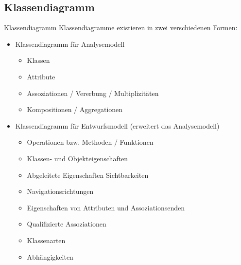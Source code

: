 \subsection{Klassendiagramm}

\begin{defi}{Klassendiagramm}
    Klassendiagramme existieren in zwei verschiedenen Formen:

    \begin{itemize}
        \item Klassendiagramm für Analysemodell
              \begin{itemize}
                  \item Klassen
                  \item Attribute
                  \item Assoziationen / Vererbung / Multiplizitäten
                  \item Kompositionen / Aggregationen
              \end{itemize}
        \item Klassendiagramm für Entwurfsmodell (erweitert das Analysemodell)
              \begin{itemize}
                  \item Operationen bzw. Methoden / Funktionen
                  \item Klassen- und Objekteigenschaften
                  \item Abgeleitete Eigenschaften Sichtbarkeiten
                  \item Navigationsrichtungen
                  \item Eigenschaften von Attributen und Assoziationsenden
                  \item Qualifizierte Assoziationen
                  \item Klassenarten
                  \item Abhängigkeiten
              \end{itemize}
    \end{itemize}
\end{defi}


